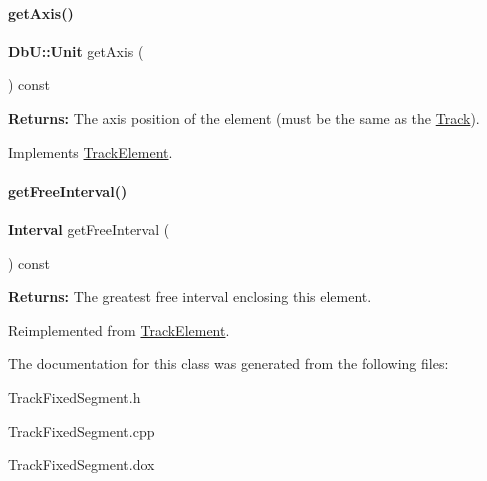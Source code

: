 \paragraph{\texorpdfstring{get\+Axis()}{getAxis()}}
{\footnotesize\ttfamily \textbf{ Db\+U\+::\+Unit} get\+Axis (\begin{DoxyParamCaption}{ }\end{DoxyParamCaption}) const\hspace{0.3cm}{\ttfamily [virtual]}}

{\bfseries Returns\+:} The axis position of the element (must be the same as the \hyperlink{classKite_1_1Track}{Track}). 

Implements \hyperlink{classKite_1_1TrackElement_ac492fb5399691d81c31547db6b56fd03}{Track\+Element}.

\mbox{\label{classKite_1_1TrackFixedSegment_a034711e2d3617ea848ef9f5a18255e10}} 
\paragraph{\texorpdfstring{get\+Free\+Interval()}{getFreeInterval()}}
{\footnotesize\ttfamily \textbf{ Interval} get\+Free\+Interval (\begin{DoxyParamCaption}{ }\end{DoxyParamCaption}) const\hspace{0.3cm}{\ttfamily [virtual]}}

{\bfseries Returns\+:} The greatest free interval enclosing this element. 

Reimplemented from \hyperlink{classKite_1_1TrackElement_a034711e2d3617ea848ef9f5a18255e10}{Track\+Element}.



The documentation for this class was generated from the following files\+:\begin{DoxyCompactItemize}
\item 
Track\+Fixed\+Segment.\+h\item 
Track\+Fixed\+Segment.\+cpp\item 
Track\+Fixed\+Segment.\+dox\end{DoxyCompactItemize}
